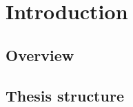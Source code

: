 \chapter{Introduction}
\label{introduction}

\section{Overview}
\label{introduction:overview}

\section{Thesis structure}
\label{introduction:structure}
